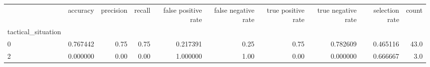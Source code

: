 \begin{tabular}{lrrrrrrrrr}
\toprule
{} &  accuracy &  precision &  recall &  false positive rate &  false negative rate &  true positive rate &  true negative rate &  selection rate &  count \\
tactical\_situation &           &            &         &                      &                      &                     &                     &                 &        \\
\midrule
0                  &  0.767442 &       0.75 &    0.75 &             0.217391 &                 0.25 &                0.75 &            0.782609 &        0.465116 &   43.0 \\
2                  &  0.000000 &       0.00 &    0.00 &             1.000000 &                 1.00 &                0.00 &            0.000000 &        0.666667 &    3.0 \\
\bottomrule
\end{tabular}
